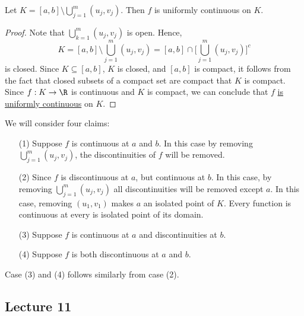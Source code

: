 \begin{lemma}[Claim 2]
    Let \( K = [a,b] \setminus  \bigcup_{ j=1 }^{ m } ({u}_{j}, {v}_{j})  \). Then \( f \) is uniformly continuous on \( K  \).
\end{lemma}
\begin{proof}
Note that \( \bigcup_{ k=1  }^{ m } ({u}_{j}, {v}_{j})   \) is open. Hence, 
\[  K = [a,b] \setminus  \bigcup_{ j=1  }^{ m }  ({u}_{j}, {v}_{j}) = [a,b] \cap \Big[ \bigcup_{ j=1  }^{ m }  ({u}_{j}, {v}_{j}) \Big]^{c} \]
is closed. Since \( K \subseteq  [a,b] \), \( K  \) is closed, and \( [a,b]  \) is compact, it follows from the fact that closed subsets of a compact set are compact that \( K  \) is compact. Since \( f: K \to \R  \) is continuous and \( K  \) is compact, we can conclude that \( f  \) {\hyperref[is uniformly continuous]{is uniformly continuous}} on \( K  \).
\end{proof}

\begin{remark}\label{is uniformly continuous}
   We will consider four claims:
   \begin{enumerate}
       \item[(1)] Suppose \( f  \) is continuous at \( a \) and \( b  \). In this case by removing \( \bigcup_{ j=1  }^{ m }  ({u}_{j}, {v}_{j})  \), the discontinuities of \( f  \) will be removed.
        \item[(2)] Since \( f  \) is discontinuous at \( a \), but continuous at \( b  \). In this case, by removing \( \bigcup_{ j=1 }^{ m } ({u}_{j},{v}_{j}) \) all discontinuities will be removed except \( a \). In this case, removing \( ({u}_{1}, {v}_{1}) \) makes \( a \) an isolated point of \( K  \). Every function is continuous at every is isolated point of its domain.
        \item[(3)] Suppose \( f \) is continuous at \( a \) and discontinuities at \( b \).
        \item[(4)] Suppose \( f \) is both discontinuous at \( a \) and \( b \).
   \end{enumerate}
   Case (3) and (4) follows similarly from case (2).
\end{remark}




\subsection{Lecture 11}


